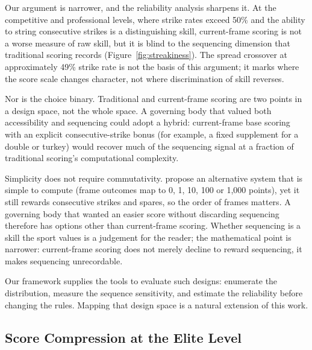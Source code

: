 \documentclass[USenglish]{article}
\theoremstyle{dgthm}
\theoremstyle{dgdef}
\begin{document}
Our argument is narrower, and the reliability analysis sharpens it. At the competitive and professional levels, where strike rates exceed 50\% and the ability to string consecutive strikes is a distinguishing skill, current-frame scoring is not a worse measure of raw skill, but it is blind to the sequencing dimension that traditional scoring records (Figure~\ref{fig:streakiness}). The spread crossover at approximately 49\% strike rate is not the basis of this argument; it marks where the score scale changes character, not where discrimination of skill reverses.

Nor is the choice binary. Traditional and current-frame scoring are two points in a design space, not the whole space. A governing body that valued both accessibility and sequencing could adopt a hybrid: current-frame base scoring with an explicit consecutive-strike bonus (for example, a fixed supplement for a double or turkey) would recover much of the sequencing signal at a fraction of traditional scoring's computational complexity.

Simplicity does not require commutativity. \citet{abdelsalam2017testing} propose an alternative system that is simple to compute (frame outcomes map to 0, 1, 10, 100 or 1,000 points), yet it still rewards consecutive strikes and spares, so the order of frames matters. A governing body that wanted an easier score without discarding sequencing therefore has options other than current-frame scoring. Whether sequencing is a skill the sport values is a judgement for the reader; the mathematical point is narrower: current-frame scoring does not merely decline to reward sequencing, it makes sequencing unrecordable.

Our framework supplies the tools to evaluate such designs: enumerate the distribution, measure the sequence sensitivity, and estimate the reliability before changing the rules. Mapping that design space is a natural extension of this work.

\subsection{Score Compression at the Elite Level}
\end{document}
